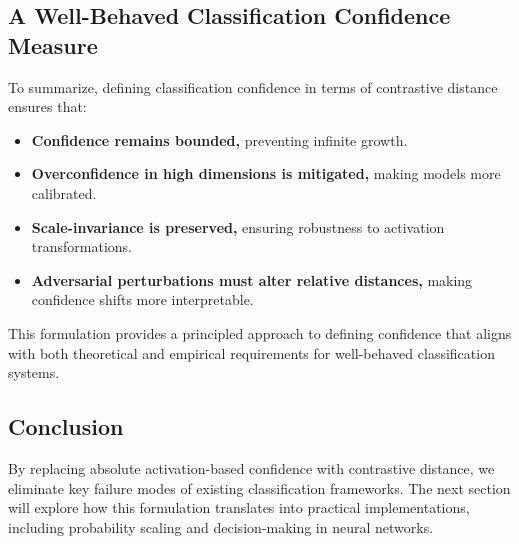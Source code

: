 \subsection{A Well-Behaved Classification Confidence Measure}

To summarize, defining classification confidence in terms of contrastive distance ensures that:

\begin{itemize}
    \item \textbf{Confidence remains bounded,} preventing infinite growth.
    \item \textbf{Overconfidence in high dimensions is mitigated,} making models more calibrated.
    \item \textbf{Scale-invariance is preserved,} ensuring robustness to activation transformations.
    \item \textbf{Adversarial perturbations must alter relative distances,} making confidence shifts more interpretable.
\end{itemize}

This formulation provides a principled approach to defining confidence that aligns with both theoretical and empirical requirements for well-behaved classification systems.

\subsection{Conclusion}

By replacing absolute activation-based confidence with contrastive distance, we eliminate key failure modes of existing classification frameworks. The next section will explore how this formulation translates into practical implementations, including probability scaling and decision-making in neural networks.
